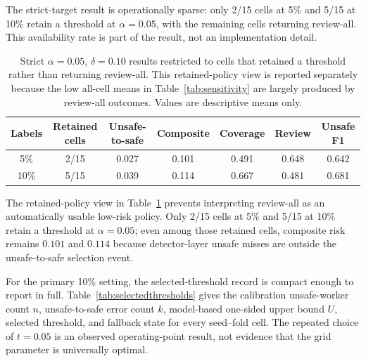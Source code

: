 \documentclass[iicol,pdflatex,sn-mathphys-num]{sn-jnl}
\begin{document}
The strict-target result is operationally sparse: only 2/15 cells at 5\% and 5/15 at 10\% retain a threshold at $\alpha=0.05$, with the remaining cells returning review-all. This availability rate is part of the result, not an implementation detail.

\begin{table}[t]
\caption{Strict $\alpha=0.05$, $\delta=0.10$ results restricted to cells that retained a threshold rather than returning review-all. This retained-policy view is reported separately because the low all-cell means in Table~\ref{tab:sensitivity} are largely produced by review-all outcomes. Values are descriptive means only.}
\label{tab:strictretained}
\centering
\scriptsize
\setlength{\tabcolsep}{5pt}
\begin{tabular}{@{}c c c c c c c@{}}
\toprule
Labels & Retained cells & Unsafe-to-safe & Composite & Coverage & Review & Unsafe F1 \\
\midrule
5\%  & 2/15 & 0.027 & 0.101 & 0.491 & 0.648 & 0.642 \\
10\% & 5/15 & 0.039 & 0.114 & 0.667 & 0.481 & 0.681 \\
\bottomrule
\end{tabular}
\end{table}

The retained-policy view in Table~\ref{tab:strictretained} prevents interpreting review-all as an automatically usable low-risk policy. Only 2/15 cells at 5\% and 5/15 at 10\% retain a threshold at $\alpha=0.05$; even among those retained cells, composite risk remains $0.101$ and $0.114$ because detector-layer unsafe misses are outside the unsafe-to-safe selection event.

For the primary 10\% setting, the selected-threshold record is compact enough to report in full. Table~\ref{tab:selectedthresholds} gives the calibration unsafe-worker count $n$, unsafe-to-safe error count $k$, model-based one-sided upper bound $U$, selected threshold, and fallback state for every seed--fold cell. The repeated choice of $t=0.05$ is an observed operating-point result, not evidence that the grid parameter is universally optimal.
\end{document}
